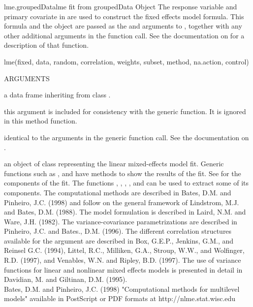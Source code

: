 \documentclass[pdftex]{article} \usepackage{url,graphicx}
\begin{document}
\begin{Helpfile}{lme.groupedData}{{\sc lme} fit from groupedData Object}
The response variable and primary covariate in 
are used to construct the fixed effects model formula. This formula
and the    object are passed as the  and
 arguments to , together with any other
additional arguments in the function call. See the documentation on
 for a description of that function.
\begin{Example}
lme(fixed, data, random, correlation, weights, subset, method,
    na.action, control)
\end{Example}
\begin{Argument}{ARGUMENTS}
\item[\Co{fixed:}]
a data frame inheriting from class .
\item[\Co{data:}]
this argument is included for consistency with the generic
function. It is ignored in this method function.
\item[\Co{other arguments:}]
identical to the arguments in the generic
function call. See the documentation on .
\end{Argument}
an object of class  representing the linear mixed-effects
model fit. Generic functions such as ,  and
 have methods to show the results of the fit. See
 for the components of the fit. The functions
, , , , and
  can be used to extract some of its components.
The computational methods are described in Bates, D.M. and Pinheiro, J.C.
(1998) and follow on the general framework of Lindstrom, M.J. and Bates,
D.M. (1988). The model formulation is described in Laird, N.M. and Ware,
J.H. (1982).  The variance-covariance parametrizations are described in
Pinheiro, J.C. and Bates., D.M.  (1996).   The different correlation
structures available for the  argument are described
in Box, G.E.P., Jenkins, G.M., and Reinsel G.C. (1994), Littel, R.C.,
Milliken, G.A., Stroup, W.W., and Wolfinger, R.D. (1997), and Venables,
W.N. and Ripley, B.D. (1997). The use of variance functions for linear
and nonlinear mixed effects models is presented in detail in Davidian,
M. and Giltinan, D.M. (1995). \\
Bates, D.M. and Pinheiro, J.C. (1998) "Computational methods for
multilevel models" available in PostScript or PDF formats at
http://nlme.stat.wisc.edu\\

\end{Helpfile}
\end{document}
